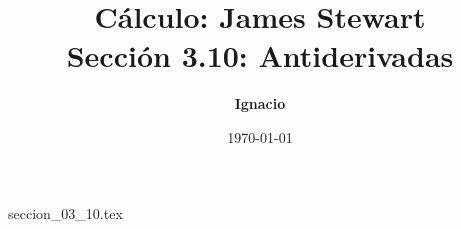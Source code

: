 \documentclass[11pt,spanish,oneside]{report}
\title{\textbf{Cálculo: James Stewart} \\ \Large Sección 3.10: Antiderivadas}
\author{\textbf{Ignacio}}
\date{\today}
\begin{document}
\maketitle

{seccion_03_10.tex}
\end{document}
